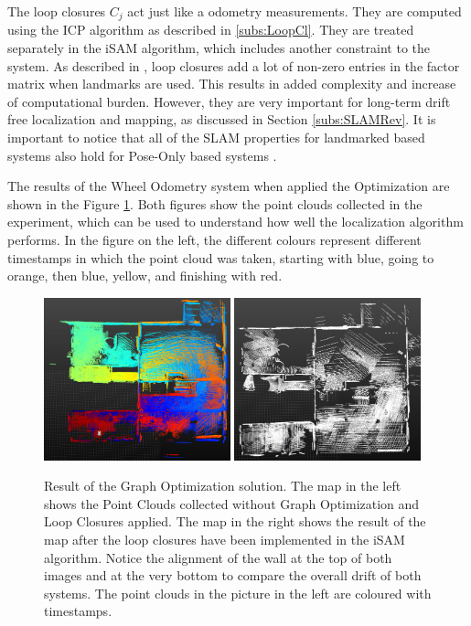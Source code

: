 \documentclass[12pt]{article}
\begin{document}
The loop closures $C_j$ act just like a odometry measurements. They are computed using the ICP algorithm as described in \ref{subs:LoopCl}. They are treated separately in the iSAM algorithm, which includes another constraint to the system. As described in \cite{Kaess08tro}, loop closures add a lot of non-zero entries in the factor matrix when landmarks are used. This results in added complexity and increase of computational burden. However, they are very important for long-term drift free localization and mapping, as discussed in Section \ref{subs:SLAMRev}. It is important to notice that all of the SLAM properties for landmarked based systems also hold for Pose-Only based systems \cite{Kaess08tro}.
	
The results of the Wheel Odometry system when applied the Optimization are shown in the Figure \ref{fig:GraphOptimization1}. Both figures show the  point clouds collected in the experiment, which can be used to understand how well the localization algorithm performs. In the figure on the left, the different colours represent different timestamps in which the point cloud was taken, starting with blue, going to orange, then blue, yellow, and finishing with red.
	
\begin{figure}[ht]
\centering
\includegraphics[width=0.48\textwidth]{ResultNoLoopClosure}
\includegraphics[width=0.48\textwidth]{ResultLoopClosure}
\caption{Result of the Graph Optimization solution. The map in the left shows the Point Clouds collected without Graph Optimization and Loop Closures applied. The map in the right shows the result of the map after the loop closures have been implemented in the iSAM algorithm. Notice the alignment of the wall at the top of both images and at the very bottom to compare the overall drift of both systems. The point clouds in the picture in the left are coloured with timestamps.}
\label{fig:GraphOptimization1}	
\end{figure}
	
\end{document}
